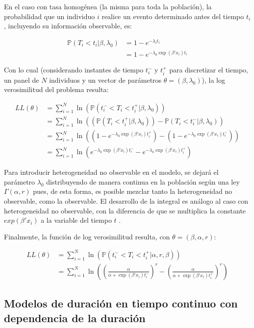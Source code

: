 \documentclass[
]{book}
\begin{document}
En el caso con tasa homogénea (la misma para toda la población), la
probabilidad que un individuo \(i\) realice un evento determinado antes
del tiempo \(t_i\), incluyendo su información observable, es:

\[
\begin{aligned}
\mathbb{P}(T_i < t_i|\beta,\lambda_0) &= 1 - e^{-\lambda_it_i}\\
&= 1 - e^{-\lambda_0 \exp(\beta'x_i)t_i}
\end{aligned}
\]

Con lo cual (considerando instantes de tiempo \(t_i^-\) y \(t_i^+\) para
discretizar el tiempo, un panel de \(N\) individuos y un vector de
parámetros \(\theta = (\beta,\lambda_0)\)), la log verosimilitud del
problema resulta:

\[
\begin{aligned}
LL(\theta) &= \sum_{i=1}^{N} \ln(\mathbb{P}(t_i^- < T_i < t_i^+|\beta,\lambda_0)) \\
&= \sum_{i=1}^{N} \ln((\mathbb{P}(T_i < t_i^+|\beta,\lambda_0)) - \mathbb{P}(T_i < t_i^-|\beta,\lambda_0)) \\
&=  \sum_{i=1}^{N} \ln \left((1 - e^{-\lambda_0 \exp(\beta'x_i)t_i^+}) - (1 - e^{-\lambda_0 \exp(\beta'x_i)t_i^-}) \right)\\
&= \sum_{i=1}^{N} \ln (e^{-\lambda_0 \exp(\beta'x_i)t_i^-} - e^{-\lambda_0 \exp(\beta'x_i)t_i^+})
\end{aligned}
\]

Para introducir heterogeneidad no observable en el modelo, se dejará el
parámetro \(\lambda_0\) distribuyendo de manera continua en la población
según una ley \(\Gamma(\alpha,r)\) pues, de esta forma, es posible mezclar
tanto la heterogeneidad no observable, como la observable. El desarrollo
de la integral es análogo al caso con heterogeneidad no observable, con
la diferencia de que se multiplica la constante \(exp(\beta' x_i)\) a la
variable del tiempo \(t\) .

Finalmente, la función de log verosimilitud resulta, con
\(\theta = (\beta,\alpha,r)\):

\[
\begin{aligned}
LL(\theta) &= \sum_{i=1}^{N} \ln(\mathbb{P} (t_i^-<T_i<t_i^+|\alpha,r,\beta))\\
&= \sum_{i=1}^{N} \ln \left(\left(\frac{\alpha}{ \alpha + \exp(\beta'x_i)t_i^-}\right)^r - \left(\frac{\alpha}{ \alpha + \exp(\beta'x_i)t_i^+}\right)^r\right)
\end{aligned}
\]

\subsection{Modelos de duración en tiempo continuo con dependencia de la duración}\label{modelos-de-duraciuxf3n-en-tiempo-continuo-con-dependencia-de-la-duraciuxf3n}
\end{document}
